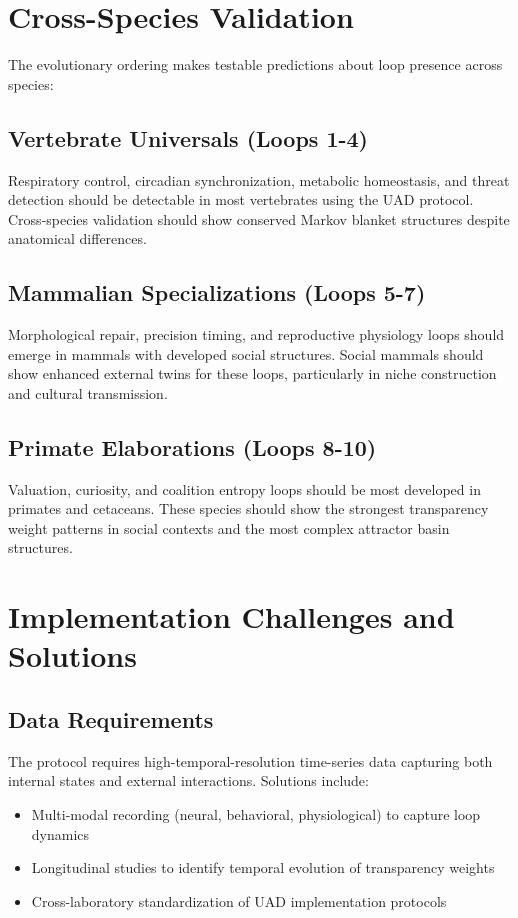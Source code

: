\documentclass[10pt,conference]{IEEEtran}
\begin{document}
\section{Cross-Species Validation}

The evolutionary ordering makes testable predictions about loop presence across species:

\subsection{Vertebrate Universals (Loops 1-4)}
Respiratory control, circadian synchronization, metabolic homeostasis, and threat detection should be detectable in most vertebrates using the UAD protocol. Cross-species validation should show conserved Markov blanket structures despite anatomical differences.

\subsection{Mammalian Specializations (Loops 5-7)}
Morphological repair, precision timing, and reproductive physiology loops should emerge in mammals with developed social structures. Social mammals should show enhanced external twins for these loops, particularly in niche construction and cultural transmission.

\subsection{Primate Elaborations (Loops 8-10)}
Valuation, curiosity, and coalition entropy loops should be most developed in primates and cetaceans. These species should show the strongest transparency weight patterns in social contexts and the most complex attractor basin structures.

\section{Implementation Challenges and Solutions}

\subsection{Data Requirements}
The protocol requires high-temporal-resolution time-series data capturing both internal states and external interactions. Solutions include:
\begin{itemize}
\item Multi-modal recording (neural, behavioral, physiological) to capture loop dynamics
\item Longitudinal studies to identify temporal evolution of transparency weights
\item Cross-laboratory standardization of UAD implementation protocols
\end{itemize}
\end{document}
